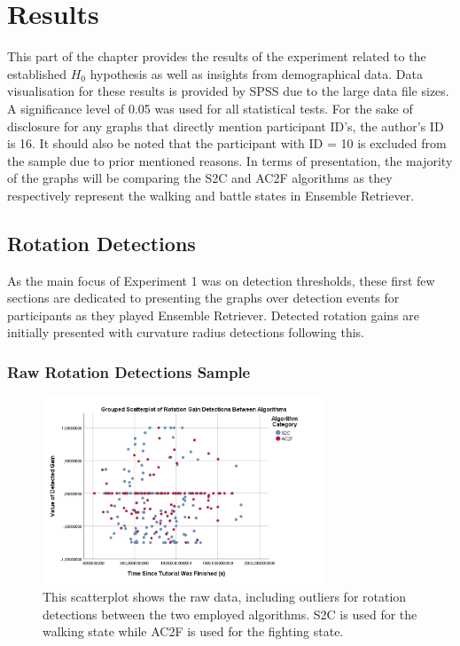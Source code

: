 \section{Results}\label{sec:ex1results}
This part of the chapter provides the results of the experiment related to the established $H_0$ hypothesis as well as insights from demographical data. Data visualisation for these results is provided by SPSS due to the large data file sizes. A significance level of 0.05 was used for all statistical tests. For the sake of disclosure for any graphs that directly mention participant ID's, the author's ID is 16. It should also be noted that the participant with ID = 10 is excluded from the sample due to prior mentioned reasons. In terms of presentation, the majority of the graphs will be comparing the S2C and AC2F algorithms as they respectively represent the walking and battle states in Ensemble Retriever.

\subsection{Rotation Detections}
As the main focus of Experiment 1 was on detection thresholds, these first few sections are dedicated to presenting the graphs over detection events for participants as they played Ensemble Retriever. Detected rotation gains are initially presented with curvature radius detections following this.

\subsubsection{Raw Rotation Detections Sample}
\begin{figure}[tbph]
    \centering
    \includegraphics[width=0.75\textwidth]{figures/graphs/RawRotationDetections.png}
    \caption[Raw Detection Scatterplot For Rotation Gains]{This scatterplot shows the raw data, including outliers for rotation detections between the two employed algorithms. S2C is used for the walking state while AC2F is used for the fighting state.}
    \label{fig:rawRotationDetectionData}
\end{figure}

